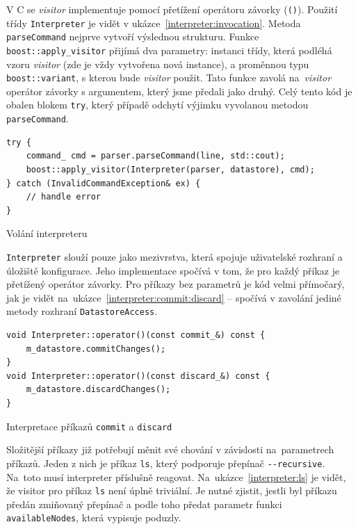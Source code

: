\documentclass[thesis=B,czech,hidelinks]{FITthesis}[2019/03/06]
\newcommand{\Rplus}{\protect\hspace{-.1em}\protect\raisebox{.35ex}{\smaller{\smaller\textbf{+}}}}
\newcommand{\Cpp}{\mbox{C\Rplus\Rplus}\xspace}
\begin{document}
V \Cpp{} se \textit{visitor} implementuje pomocí přetížení operátoru závorky (\texttt{()}). Použití třídy \texttt{Interpreter} je vidět v ukázce~\ref{interpreter:invocation}. Metoda \texttt{parseCommand} nejprve vytvoří výslednou strukturu. Funkce \texttt{boost::apply\_visitor} přijímá dva parametry: instanci třídy, která podléhá vzoru \textit{visitor} (zde je vždy vytvořena nová instance), a proměnnou typu \texttt{boost::variant}, s kterou bude \textit{visitor} použit. Tato funkce zavolá na~\textit{visitor} operátor závorky s argumentem, který jsme předali jako druhý. Celý tento kód je obalen blokem \texttt{try}, který případě odchytí výjimku vyvolanou metodou \texttt{parseCommand}.

\begin{listing}[H]
\begin{verbatim}
try {
    command_ cmd = parser.parseCommand(line, std::cout);
    boost::apply_visitor(Interpreter(parser, datastore), cmd);
} catch (InvalidCommandException& ex) {
    // handle error
}
\end{verbatim}
\caption{Volání interpreteru}\label{interpreter:invocation}
\end{listing}

\texttt{Interpreter} slouží pouze jako mezivrstva, která spojuje uživatelské rozhraní a úložiště konfigurace. Jeho implementace spočívá v tom, že pro každý příkaz je přetížený operátor závorky. Pro příkazy bez parametrů je kód velmi přímočarý, jak je vidět na~ukázce~\ref{interpreter:commit:discard} -- spočívá v zavolání jediné metody rozhraní \texttt{DatastoreAccess}.

\begin{listing}[H]
\begin{verbatim}
void Interpreter::operator()(const commit_&) const {
    m_datastore.commitChanges();
}
void Interpreter::operator()(const discard_&) const {
    m_datastore.discardChanges();
}
\end{verbatim}
\caption{Interpretace příkazů \texttt{commit} a \texttt{discard}}\label{interpreter:commit:discard}
\end{listing}

Složitější příkazy již potřebují měnit své chování v závislosti na~parametrech příkazů. Jeden z nich je příkaz \texttt{ls}, který podporuje přepínač \verb¨--recursive¨. Na~toto musí interpreter příslušně reagovat. Na~ukázce~\ref{interpreter:ls} je vidět, že visitor pro příkaz \texttt{ls} není úplně triviální. Je nutné zjistit, jestli byl příkazu předán zmiňovaný přepínač a podle toho předat parametr funkci \texttt{availableNodes}, která vypisuje poduzly.
\end{document}
